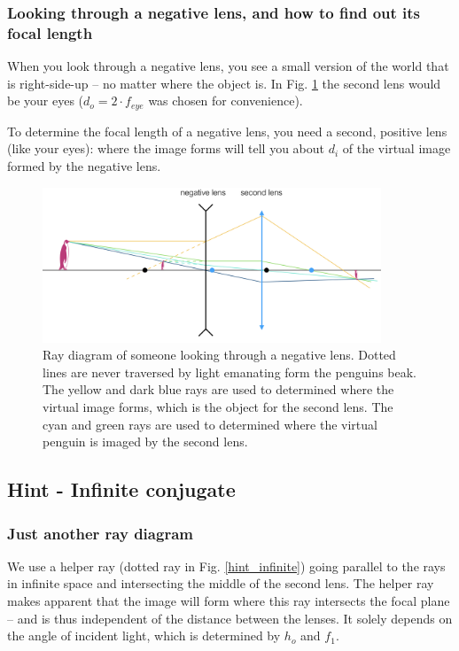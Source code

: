 \documentclass[a4paper]{report}
\begin{document}
	
	\subsubsection{Looking through a negative lens, and how to find out its focal length}
	When you look through a negative lens, you see a small version of the world that is right-side-up -- no matter where the object is. In Fig. \ref{fig:neglens} the second lens would be your eyes ($d_o = 2\cdot f_{eye}$ was chosen for convenience).

	
	To determine the focal length of a negative lens, you need a second, positive lens (like your eyes): where the image forms will tell you about $d_i$ of the virtual image formed by the negative lens. 


    
	\begin{figure}[h]
		\center
		\includegraphics[width=0.9\textwidth]{figures/negative_lens.png}
		\captionsetup{width=0.9\textwidth}
		\caption{Ray diagram of someone looking through a negative lens. Dotted lines are never traversed by light emanating form the penguins beak. The yellow and dark blue rays are used to determined where the virtual image forms, which is the object for the second lens. The cyan and green rays are used to determined where the virtual penguin is imaged by the second lens.}
		\label{fig:neglens}
	\end{figure}
	
	
    \clearpage
    
    
    \subsection{Hint - Infinite conjugate}
	\hypertarget{hintTo-infinite}{}
	
	\subsubsection{Just another ray diagram}
	We use a helper ray (dotted ray in Fig. \ref{hint_infinite}) going parallel to the rays in infinite space and intersecting the middle of the second lens. The helper ray makes apparent that the image will form where this ray intersects the focal plane -- and is thus independent of the distance between the lenses. It solely depends on the angle of incident light, which is determined by $h_o$ and $f_1$.
	
\end{document}
